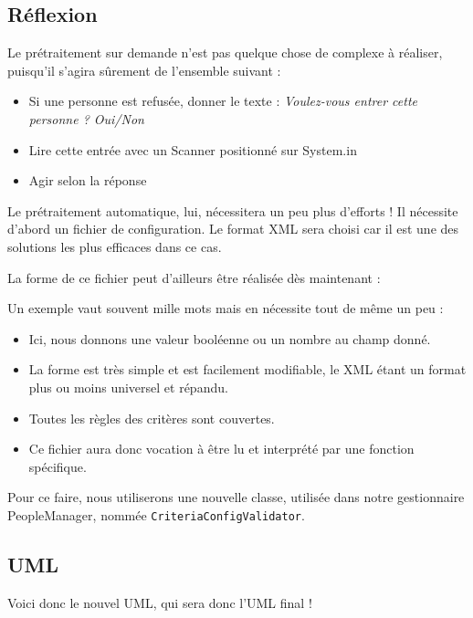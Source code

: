 \documentclass{mytex}
\begin{document}
\subsection{Réflexion}

Le prétraitement sur demande n'est pas quelque chose de complexe à réaliser, puisqu'il s'agira sûrement de l'ensemble suivant :

\begin{itemize}
	\item Si une personne est refusée, donner le texte : \textit{Voulez-vous entrer cette personne ? Oui/Non}
	\item Lire cette entrée avec un Scanner positionné sur System.in
	\item Agir selon la réponse
\end{itemize}

Le prétraitement automatique, lui, nécessitera un peu plus d'efforts ! Il nécessite d'abord un fichier de configuration. Le format XML sera choisi car il est une des solutions les plus efficaces dans ce cas.

La forme de ce fichier peut d'ailleurs être réalisée dès maintenant :


Un exemple vaut souvent mille mots mais en nécessite tout de même un peu :

\begin{itemize}
	\item Ici, nous donnons une valeur booléenne ou un nombre au champ donné.
	\item La forme est très simple et est facilement modifiable, le XML étant un format plus ou moins universel et répandu.
	\item Toutes les règles des critères sont couvertes.
	\item Ce fichier aura donc vocation à être lu et interprété par une fonction spécifique.
\end{itemize}

Pour ce faire, nous utiliserons une nouvelle classe, utilisée dans notre gestionnaire PeopleManager, nommée \texttt{CriteriaConfigValidator}.

\subsection{UML}

Voici donc le nouvel UML, qui sera donc l'UML final !
\end{document}

